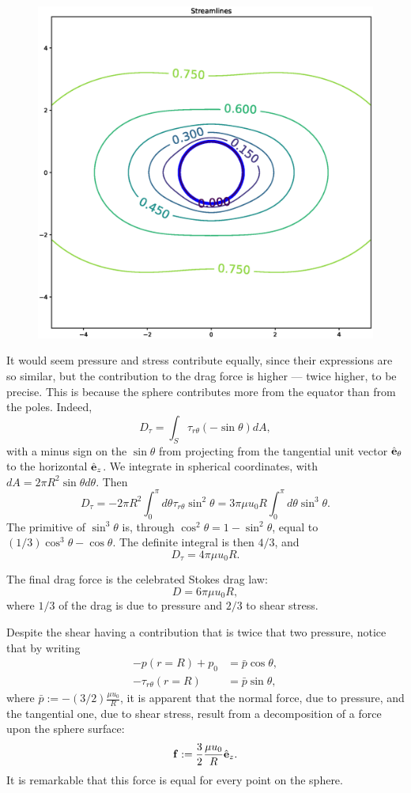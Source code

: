 \begin{figure}
  \centering
  \includegraphics[width=0.8\linewidth]{figures/creeping_flow_past_sphere_vel}
  \caption{\label{fig:creeping_flow_past_sphere_vel}}
\end{figure}


It would seem pressure and stress contribute equally, since their
expressions are so similar, but the contribution to the drag force is
higher --- twice higher, to be precise. This is because the sphere
contributes more from the equator than from the poles. Indeed,
\[
  D_\tau =  \int_S  \tau_{r\theta} (- \sin\theta) dA ,
\]
with a minus sign on the $\sin\theta$ from projecting from the
tangential unit vector $\hat{\mathbf{e}}_\theta$ to the horizontal $\hat{\mathbf{e}}_z$.  We
integrate in spherical coordinates, with
$dA=2\pi R^2 \sin\theta d\theta$. Then
\[
  D_\tau =
  - 2\pi R^2 \int_0^\pi d\theta   \tau_{r\theta} \sin^2\theta  =
  3 \pi \mu u_0 R  \int_0^\pi d\theta \sin^3\theta .
\]
The primitive of $\sin^3\theta$ is, through
$\cos^2\theta=1-\sin^2\theta$, equal to
$(1/3) \cos^3\theta - \cos\theta$. The definite integral is then $4/3$, and
\[
  D_\tau = 4 \pi \mu u_0 R .
\]

The final drag force is the celebrated Stokes drag law: 
\[
  D = 6 \pi \mu u_0 R ,
\]
where $1/3$ of the drag is due to pressure and $2/3$ to shear stress.

Despite the shear having a contribution that is twice that two
pressure, notice that by writing 
\begin{align*}
  - p(r=R) + p_0 &= \bar{p} \cos\theta,  \\
  -\tau_{r\theta} (r=R) &= \bar{p} \sin\theta,  
\end{align*}
where $\bar{p} := - (3/2) \frac{\mu u_0}{R}$, it is apparent that the
normal force, due to pressure, and the tangential one, due to shear
stress, result from a decomposition of a force upon the sphere surface:
\[
  \mathbf{f} := \frac32 \frac{\mu u_0}{R} \hat{\mathbf{e}}_z .
\]
It is remarkable that this force is equal for every point on the
sphere.

